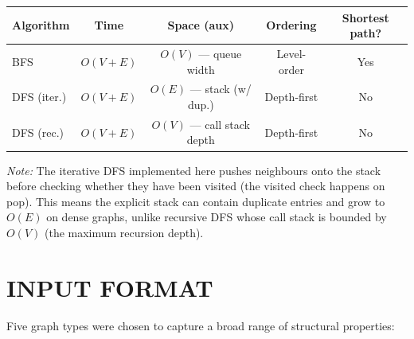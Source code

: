 \documentclass[12pt]{article}
\begin{document}
\begin{center}
\renewcommand{\arraystretch}{1.4}
\begin{tabular}{lcccc}
\toprule
\textbf{Algorithm} & \textbf{Time} & \textbf{Space (aux)} & \textbf{Ordering} & \textbf{Shortest path?} \\
\midrule
BFS           & $O(V + E)$ & $O(V)$ --- queue width  & Level-order  & Yes \\
DFS (iter.)   & $O(V + E)$ & $O(E)$ --- stack (w/ dup.) & Depth-first & No  \\
DFS (rec.)    & $O(V + E)$ & $O(V)$ --- call stack depth & Depth-first & No  \\
\bottomrule
\end{tabular}
\end{center}

\noindent\textit{Note:} The iterative DFS implemented here pushes neighbours onto the
stack before checking whether they have been visited (the visited check happens on pop).
This means the explicit stack can contain duplicate entries and grow to $O(E)$ on dense
graphs, unlike recursive DFS whose call stack is bounded by $O(V)$ (the maximum
recursion depth).

\section*{INPUT FORMAT}

\hspace{0.8cm} Five graph types were chosen to capture a broad range of structural
properties:
\end{document}
